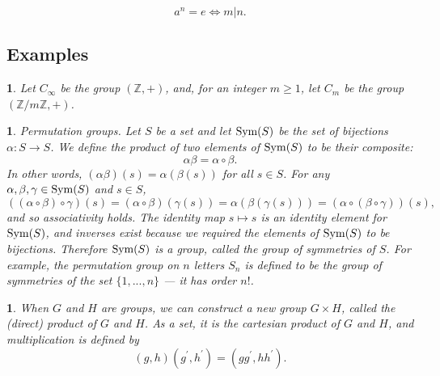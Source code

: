 \documentclass[a4paper,11pt,final]{memoir}%
\newtheorem{plain}[X]{}
\theoremstyle{nonumberplain}
\begin{document}
\[
a^{n}=e\iff m|n.
\]


\subsection{Examples}

\begin{plain}
\label{bd3a}Let $C_{\infty}$ be the group $(\mathbb{Z}{},+)$, and, for an
integer $m\geq1$, let $C_{m}$ be the group $(\mathbb{Z}/m\mathbb{Z}{},+)$.%
%

\end{plain}

\begin{plain}
\label{bd3b}\emph{Permutation groups.\/} Let $S$ be a set and let $\operatorname{Sym}(S)$ be
the set of bijections $\alpha\colon S\rightarrow S$. We define the product of
two elements of $\operatorname{Sym}(S)$ to be their composite:
\[
\alpha\beta=\alpha\circ\beta.
\]
In other words, $(\alpha\beta)(s)=\alpha(\beta(s))$ for all $s\in S$. For any
$\alpha,\beta,\gamma\in\operatorname{Sym}(S)$ and $s\in S$,
\begin{equation}
\left(  (\alpha\circ\beta)\circ\gamma\right)  (s)=(\alpha\circ\beta
)(\gamma(s))=\alpha(\beta(\gamma(s)))=\left(  \alpha\circ(\beta\circ
\gamma)\right)  (s), \label{e11}%
\end{equation}
and so associativity holds. The identity map $s\mapsto s$ is an identity
element for $\operatorname{Sym}(S)$, and inverses exist because we required the elements of
$\operatorname{Sym}(S)$ to be bijections. Therefore $\operatorname{Sym}(S)$ is a group, called the
\emph{group of symmetries}%
of $S$. For example, the \emph{permutation group on} $n$ \emph{letters}%
%
%
\/ $S_{n}$ is defined to be the group of symmetries of the set $\{1,...,n\}$
--- it has order $n!$.
\end{plain}

\begin{plain}
\label{bd3c}When $G$ and $H$ are groups, we can construct a new group $G\times
H$, called the \emph{(direct) product\/}%
of $G$ and $H$. As a set, it is the cartesian product of $G$ and $H$, and
multiplication is defined by
\[
(g,h)(g^{\prime},h^{\prime})=(gg^{\prime},hh^{\prime}).
\]

\end{plain}
\end{document}
